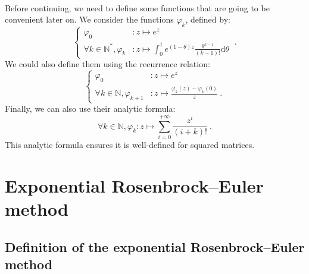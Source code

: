     \paragraph{}
    Before continuing, we need to define some functions that are going to be convenient later on.
    We consider the functions $\varphi_k$, defined by:
    \begin{equation}
      \left\{\begin{aligned}
        \varphi_0 &: z \mapsto e^z \\
        \forall k \in \mathbb{N}^*, \varphi_{k} &: z \mapsto \int_0^1 e^{\left(1 - \theta\right)z} \frac{\theta^{k-1}}{\left(k-1\right)!} \mathrm{d}\theta
      \end{aligned}\right.\ .
    \end{equation}
    We could also define them using the recurrence relation:
    \begin{equation}
      \left\{\begin{aligned}
        \varphi_0 &: z \mapsto e^z \\
        \forall k \in \mathbb{N}, \varphi_{k+1} &: z \mapsto \frac{\varphi_k\left(z\right) - \varphi_k\left(0\right)}{z} \ .
      \end{aligned}\right.
    \end{equation}
    Finally, we can also use their analytic formula:
    \begin{equation}
      \forall k \in \mathbb{N}, \varphi_{k} : z \mapsto \sum_{i = 0}^{+\infty} \frac{z^i}{\left(i + k\right)!} \ .
    \end{equation}
    This analytic formula ensures it is well-defined for squared matrices.


  \section{Exponential Rosenbrock--Euler method}

    \subsection{Definition of the exponential Rosenbrock--Euler method}

